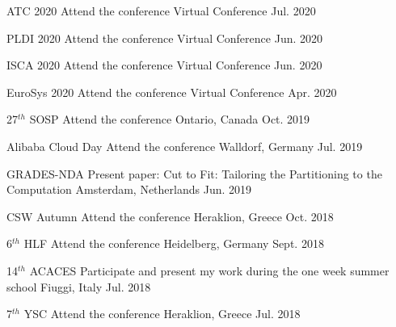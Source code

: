 
\begin{cvhonors}
  \cvhonor
    {ATC 2020} %
    {Attend the conference} %
    {Virtual Conference} %
    {Jul. 2020} %

  \cvhonor
    {PLDI 2020} %
    {Attend the conference} %
    {Virtual Conference} %
    {Jun. 2020} %

  \cvhonor
    {ISCA 2020} %
    {Attend the conference} %
    {Virtual Conference} %
    {Jun. 2020} %

  \cvhonor
    {EuroSys 2020} %
    {Attend the conference} %
    {Virtual Conference} %
    {Apr. 2020} %

  \cvhonor
    {27$^{th}$ SOSP} %
    {Attend the conference} %
    {Ontario, Canada} %
    {Oct. 2019} %

  \cvhonor
    {Alibaba Cloud Day} %
    {Attend the conference} %
    {Walldorf, Germany} %
    {Jul. 2019} %

  \cvhonor
    {GRADES-NDA} %
    {Present paper: Cut to Fit: Tailoring the Partitioning to the
    Computation} %
    {Amsterdam, Netherlands} %
    {Jun. 2019} %

  \cvhonor
    {CSW Autumn} %
    {Attend the conference} %
    {Heraklion, Greece} %
    {Oct. 2018} %

  \cvhonor
    {6$^{th}$ HLF} %
    {Attend the conference} %
    {Heidelberg, Germany} %
    {Sept. 2018} %

  \cvhonor
    {14$^{th}$ ACACES} %
    {Participate and present my work during the one week summer school} %
    {Fiuggi, Italy} %
    {Jul. 2018} %

  \cvhonor
    {7$^{th}$ YSC} %
    {Attend the conference} %
    {Heraklion, Greece} %
    {Jul. 2018} %


\end{cvhonors}
